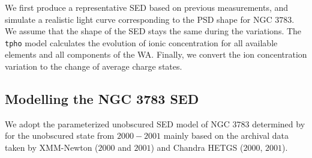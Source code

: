 \documentclass{aa}
\begin{document}
We first produce a representative SED based on previous measurements, and simulate a realistic light curve corresponding to the PSD shape for NGC $3783$.
We assume that the shape of the SED stays the same during the variations.
The \texttt{tpho} model calculates the evolution of ionic concentration for all available elements and all components of the WA.
Finally, we convert the ion concentration variation to the change of average charge states.



\subsection{Modelling the NGC 3783 SED}\label{subsect:sed}

We adopt the parameterized unobscured SED model of NGC $3783$ determined by \cite{Mehdipour2017A&A} for the unobscured state from $2000-2001$ mainly based on the archival data taken by XMM-Newton ($2000$ and $2001$) and Chandra HETGS ($2000$, $2001$).

\end{document}
